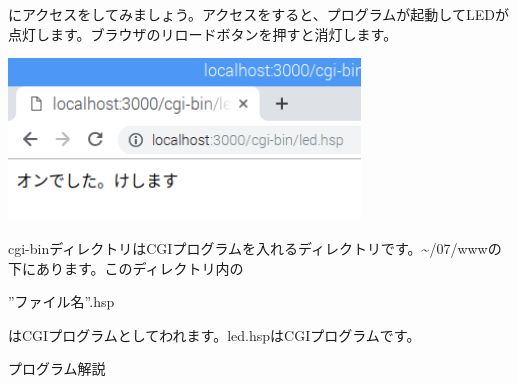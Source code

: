 にアクセスをしてみましょう。アクセスをすると、プログラムが起動してLEDが点灯します。ブラウザのリロードボタンを押すと消灯します。

\centering
\includegraphics[width=0.7\textwidth]{text07-img/ome7-img052.png}
\flushleft

cgi-binディレクトリはCGIプログラムを入れるディレクトリです。{\textasciitilde}/07/wwwの下にあります。このディレクトリ内の

”ファイル名”.hsp

はCGIプログラムとしてわれます。led.hspはCGIプログラムです。


\bigskip

\clearpage
プログラム解説


